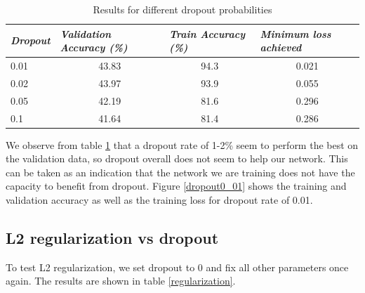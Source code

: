 \documentclass[12pt,twoside]{article}
\begin{document}
\begin{table}[!htbp]
\centering
\begin{tabular}{|l|c|c|c|}
\hline
\textit{\textbf{Dropout}} & \multicolumn{1}{l|}{\textit{\textbf{Validation Accuracy (\%)}}} & \multicolumn{1}{l|}{\textit{\textbf{Train Accuracy (\%)}}} & \multicolumn{1}{l|}{\textit{\textbf{Minimum loss achieved}}} \\ \hline
0.01                      & 43.83                                                           & 94.3                                                       & 0.021                                                        \\ \hline
0.02                      & 43.97                                                           & 93.9                                                       & 0.055                                                        \\ \hline
0.05                      & 42.19                                                           & 81.6                                                       & 0.296                                                        \\ \hline
0.1                       & 41.64                                                           & 81.4                                                       & 0.286                                                        \\ \hline
\end{tabular}
\caption{Results for different dropout probabilities}
\label{dropout}
\end{table}

We observe from table \ref{dropout} that a dropout rate of 1-2\% seem to perform the best on the validation data, so dropout overall does not seem to help our network. This can be taken as an indication that the network we are training does not have the capacity to benefit from dropout. Figure \ref{dropout0_01} shows the training and validation accuracy as well as the training loss for dropout rate of 0.01. 

\subsection{L2 regularization vs dropout}

To test L2 regularization, we set dropout to 0 and fix all other parameters once again. The results are shown in table \ref{regularization}.
\end{document}
